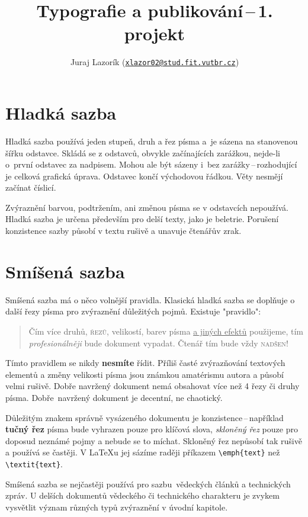 \documentclass[a4paper, 10pt, twocolumn, hidelinks]{article}
\title{Typografie a publikování\,--\,1. projekt}
\author{Juraj Lazorík (\href{mailto:xlazor02@stud.fit.vutbr.cz}{\nolinkurl{xlazor02@stud.fit.vutbr.cz}})}
\date{}
\begin{document}
\maketitle

\section{Hladká sazba}
Hladká sazba používá jeden stupeň, druh a řez písma a~je sázena na stanovenou šířku odstavce. Skládá se z odstavců, obvykle začínajících zarážkou, \mbox{nejde-li} o~první odstavec za nadpisem. Mohou ale být sázeny i~bez zarážky\,--\,rozhodující je celková grafická úprava. Odstavec končí východovou řádkou. Věty nesmějí za\-čínat číslicí.

Zvýraznění barvou, podtržením, ani změnou písma se v odstavcích nepoužívá. Hladká sazba je určena pře\-devším pro delší texty, jako je beletrie. Porušení konzistence sazby působí v textu rušivě a unavuje čtenářův zrak.

\section{Smíšená sazba}
Smíšená sazba má o něco volnější pravidla. Klasická hladká sazba se doplňuje o další řezy písma pro zvý\-raznění důležitých pojmů. Existuje "pravidlo":

\begin{quotation}
{\selectfont Čím více druhů}, {\scshape řezů}, {\scriptsize velikostí}, barev písma \underline{a jiných efektů} použijeme, tím {\large \emph{profesionálněji}} bude dokument vypadat. Čtenář tím bude vždy {\scshape nadšen}!
\end{quotation}

{\footnotesize Tímto} pravidlem se nikdy \textbf{nesmíte} řídit. Příliš časté {\large zvýrazňování} textových elementů a změny velikosti {\LARGE písma} jsou známkou amatérismu autora a působí {\huge velmi} rušivě. Dobře navržený dokument nemá \mbox{obsahovat} více než
4 řezy či druhy písma. Dobře~navr\-žený dokument je decentní, ne chaotický.

Důležitým znakem správně vysázeného dokumentu je konzistence\,--\,například \textbf{tučný řez} písma bude vyhrazen pouze pro klíčová slova, \emph{skloněný řez} pouze pro doposud neznámé pojmy a nebude se to míchat. \mbox{Skloněný} řez nepůsobí tak rušivě a používá se častěji. V {\LaTeX}u jej sázíme raději příkazem \verb|\emph{text}| než \verb|\textit{text}|.

Smíšená sazba se nejčastěji používá pro sazbu~vědec\-kých článků a technických zpráv. U delších \mbox{dokumentů} vědeckého či technického charakteru je zvykem vysvět\-lit význam různých typů zvýraznění v úvodní kapitole.
\end{document}

